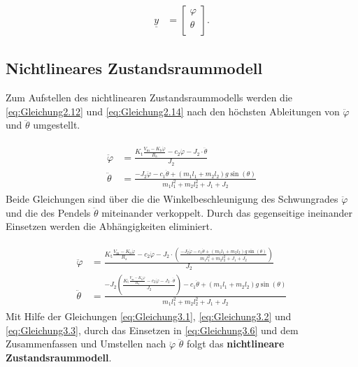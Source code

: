 \begin{align}
    \underline{y} &=
    \begin{bmatrix} \label{eq:Gleichung3.4}
        \varphi     \\
        \theta      \\
    \end{bmatrix}.
\end{align}

\subsection{Nichtlineares Zustandsraummodell} \label{sec:nichtlinearesZustandsraummodell}

Zum Aufstellen des nichtlinearen Zustandsraummodells werden die \autoref{eq:Gleichung2.12} und \autoref{eq:Gleichung2.14} nach den höchsten Ableitungen von $\ddot\varphi$ und $\ddot\theta$ umgestellt.

\begin{align} \label{eq:Gleichung3.5}
    \begin{split}
        \ddot\varphi &= \frac{K_{\mathrm{t}} \frac{V_{\mathrm{m}} - K_{\mathrm{b}} \dot\varphi}{R_{\mathrm{a}}} - c_2 \dot\varphi - J_2 \cdot \ddot\theta}{J_2} \\
        \ddot\theta &= \frac{-J_2 \ddot\varphi - c_1 \dot\theta + \left( m_1 l_1 + m_2 l_2\right) g \sin(\theta)}{m_1 l_1^2 + m_2 l_2^2 + J_1 + J_2}
    \end{split}
\end{align}
\newline
Beide Gleichungen sind über die die Winkelbeschleunigung des Schwungrades $\ddot\varphi$ und die des Pendels $\ddot\theta$ miteinander verkoppelt. Durch das gegenseitige ineinander Einsetzen werden die Abhängigkeiten eliminiert.

\begin{align} \label{eq:Gleichung3.6}
    \begin{split}
        \ddot\varphi &= \frac{K_{\mathrm{t}} \frac{V_{\mathrm{m}} - K_{\mathrm{b}} \dot\varphi}{R_{\mathrm{a}}} - c_2 \dot\varphi - J_2 \cdot \left( \frac{-J_2 \ddot\varphi - c_1 \dot\theta + \left( m_1 l_1 + m_2 l_2\right) g \sin(\theta)}{m_1 l_1^2 + m_2 l_2^2 + J_1 + J_2}\right)}{J_2} \\
        \ddot\theta &= \frac{-J_2 \left( \frac{K_{\mathrm{t}} \frac{V_{\mathrm{m}} - K_{\mathrm{b}} \dot\varphi}{R_{\mathrm{a}}} - c_2 \dot\varphi - J_2 \cdot \ddot\theta}{J_2}\right) - c_1 \dot\theta + \left( m_1 l_1 + m_2 l_2\right) g \sin(\theta)}{m_1 l_1^2 + m_2 l_2^2 + J_1 + J_2}
    \end{split}
\end{align}
\newline
Mit Hilfe der Gleichungen \ref{eq:Gleichung3.1}, \ref{eq:Gleichung3.2} und \ref{eq:Gleichung3.3}, durch das Einsetzen in \autoref{eq:Gleichung3.6} und dem Zusammenfassen und Umstellen nach $\ddot\varphi$ \bzw $\ddot\theta$ folgt das \textbf{nichtlineare Zustandsraummodell}.

